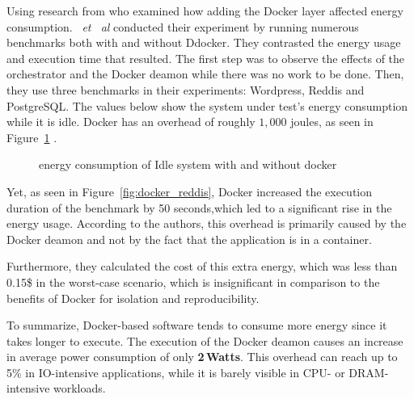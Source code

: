 Using research from \cite{santos2018does} who examined how adding the Docker layer affected energy consumption. \citeauthor{santos2018does}~\emph{et~ al} conducted their experiment by running numerous benchmarks both with and without Ddocker. They contrasted the energy usage and execution time that resulted.
The first step was to observe the effects of the orchestrator and the Docker deamon while there was no work to be done.
Then, they use three benchmarks in their experiments: Wordpress, Reddis and PostgreSQL.
The values below show the system under test's energy consumption while it is idle.
Docker has an overhead of roughly $1,000$  joules, as seen in Figure~\ref{fig:docker_idle} .


\begin{figure}
    \caption{energy consumption of Idle system with and without docker \cite{santos2018does}}\label{fig:docker_idle}
\end{figure}

Yet, as seen in Figure~\ref{fig:docker_reddis}, Docker increased the execution duration of the benchmark by 50 seconds,which led to a significant rise in the energy usage.
According to the authors, this overhead is primarily caused by the Docker deamon and not by the fact that  the application is in a container.


Furthermore, they calculated the cost of this extra energy, which was less than 0.15\$ in the worst-case scenario, which is insignificant in comparison to the benefits of Docker for isolation and reproducibility.

To summarize, Docker-based software tends to consume more energy since it takes longer to execute.
The execution of the Docker deamon causes an increase in average power consumption of only \textbf{2\,Watts}.
This overhead can reach up to 5\% in IO-intensive applications, while it is barely visible in CPU- or DRAM-intensive workloads.




